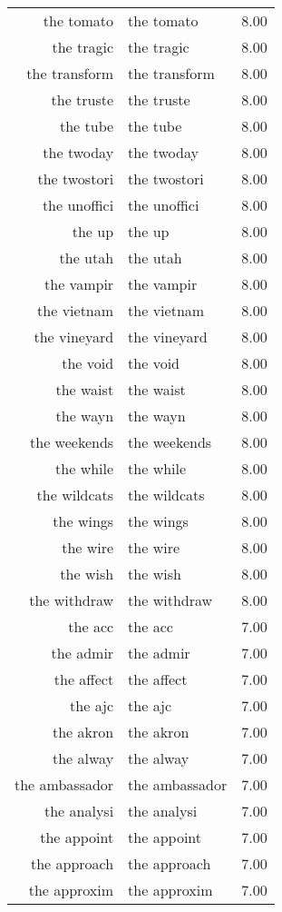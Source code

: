 \begin{table}[ht]
\begin{tabular}{rlr}
  the tomato & the tomato & 8.00 \\ 
  the tragic & the tragic & 8.00 \\ 
  the transform & the transform & 8.00 \\ 
  the truste & the truste & 8.00 \\ 
  the tube & the tube & 8.00 \\ 
  the twoday & the twoday & 8.00 \\ 
  the twostori & the twostori & 8.00 \\ 
  the unoffici & the unoffici & 8.00 \\ 
  the up & the up & 8.00 \\ 
  the utah & the utah & 8.00 \\ 
  the vampir & the vampir & 8.00 \\ 
  the vietnam & the vietnam & 8.00 \\ 
  the vineyard & the vineyard & 8.00 \\ 
  the void & the void & 8.00 \\ 
  the waist & the waist & 8.00 \\ 
  the wayn & the wayn & 8.00 \\ 
  the weekends & the weekends & 8.00 \\ 
  the while & the while & 8.00 \\ 
  the wildcats & the wildcats & 8.00 \\ 
  the wings & the wings & 8.00 \\ 
  the wire & the wire & 8.00 \\ 
  the wish & the wish & 8.00 \\ 
  the withdraw & the withdraw & 8.00 \\ 
  the acc & the acc & 7.00 \\ 
  the admir & the admir & 7.00 \\ 
  the affect & the affect & 7.00 \\ 
  the ajc & the ajc & 7.00 \\ 
  the akron & the akron & 7.00 \\ 
  the alway & the alway & 7.00 \\ 
  the ambassador & the ambassador & 7.00 \\ 
  the analysi & the analysi & 7.00 \\ 
  the appoint & the appoint & 7.00 \\ 
  the approach & the approach & 7.00 \\ 
  the approxim & the approxim & 7.00 \\ 

\end{tabular}
\end{table}
